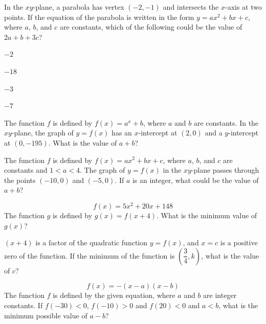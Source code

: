 \vfill
\clearpage
\noindent\begin{minipage}{\linewidth}
\par\smallskip
In the $xy$-plane, a parabola has vertex $(-2,-1)$ and intersects the $x$-axis at two points. If the equation of the parabola is written in the form $y=ax^2+bx+c$, where $a$, $b$, and $c$ are constants, which of the following could be the value of $2a+b+3c$?
\begin{satchoices}
  \item[A)] $-2$
  \item[B)] $-18$
  \item[C)] $-3$
  \item[D)] $-7$
\end{satchoices}
\end{minipage}
\vfill
\noindent\begin{minipage}{\linewidth}
\par\smallskip
The function $f$ is defined by $f(x)=a^x+b$, where $a$ and $b$ are constants. In the $xy$-plane, the graph of $y=f(x)$ has an $x$-intercept at $(2,0)$ and a $y$-intercept at $(0,-195)$. What is the value of $a+b$?
\end{minipage}
\vfill
\noindent\begin{minipage}{\linewidth}
\par\smallskip
The function $f$ is defined by $f(x)=ax^2+bx+c$, where $a$, $b$, and $c$ are constants and $1<a<4$. The graph of $y=f(x)$ in the $xy$-plane passes through the points $(-10,0)$ and $(-5,0)$. If $a$ is an integer, what could be the value of $a+b$?
\end{minipage}
\vfill
\clearpage
\noindent\begin{minipage}{\linewidth}
\par\smallskip
$$f(x)=5x^2+20x+148$$ The function $g$ is defined by $g(x)=f(x+4)$. What is the minimum value of $g(x)$?
\end{minipage}
\vfill
\noindent\begin{minipage}{\linewidth}
\par\smallskip
$(x+4)$ is a factor of the quadratic function $y=f(x)$, and $x=c$ is a positive zero of the function. If the minimum of the function is $\left(\dfrac{3}{4},k\right)$, what is the value of $c$?
\end{minipage}
\vfill
\noindent\begin{minipage}{\linewidth}
\par\smallskip
$$f(x)=-(x-a)(x-b)$$ The function $f$ is defined by the given equation, where $a$ and $b$ are integer constants. If $f(-30)<0$, $f(-10)>0$ and $f(20)<0$ and $a<b$, what is the minimum possible value of $a-b$?
\end{minipage}
